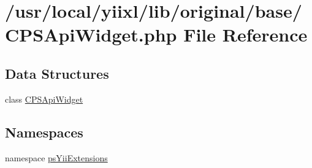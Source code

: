 \hypertarget{CPSApiWidget_8php}{
\section{/usr/local/yiixl/lib/original/base/CPSApiWidget.php File Reference}
\label{CPSApiWidget_8php}
}
\subsection*{Data Structures}
\begin{DoxyCompactItemize}
\item 
class \hyperlink{classCPSApiWidget}{CPSApiWidget}
\end{DoxyCompactItemize}
\subsection*{Namespaces}
\begin{DoxyCompactItemize}
\item 
namespace \hyperlink{namespacepsYiiExtensions}{psYiiExtensions}
\end{DoxyCompactItemize}
